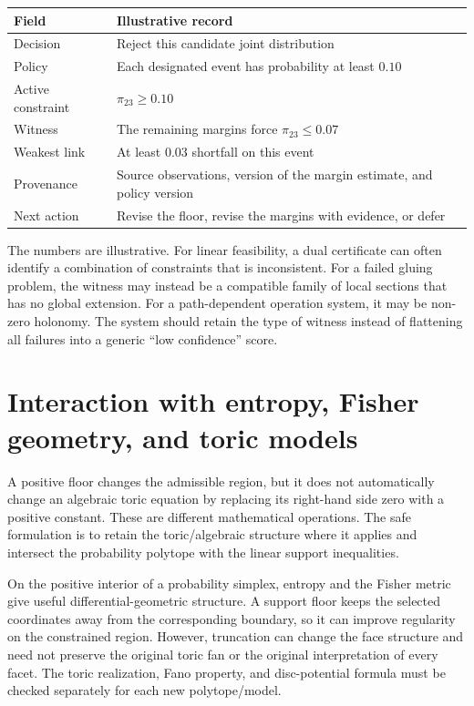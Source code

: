\documentclass[11pt]{article}
\begin{document}
\begin{center}
\begin{tabular}{>{\raggedright\arraybackslash}p{.25\linewidth}p{.64\linewidth}}
\toprule
Field & Illustrative record \\
\midrule
Decision & Reject this candidate joint distribution \\
Policy & Each designated event has probability at least $0.10$ \\
Active constraint & $\pi_{23}\geq0.10$ \\
Witness & The remaining margins force $\pi_{23}\leq0.07$ \\
Weakest link & At least $0.03$ shortfall on this event \\
Provenance & Source observations, version of the margin estimate, and policy version \\
Next action & Revise the floor, revise the margins with evidence, or defer \\
\bottomrule
\end{tabular}
\end{center}

The numbers are illustrative. For linear feasibility, a dual certificate can often identify a combination of constraints that is inconsistent. For a failed gluing problem, the witness may instead be a compatible family of local sections that has no global extension. For a path-dependent operation system, it may be non-zero holonomy. The system should retain the type of witness instead of flattening all failures into a generic ``low confidence'' score.

\section{Interaction with entropy, Fisher geometry, and toric models}

A positive floor changes the admissible region, but it does not automatically change an algebraic toric equation by replacing its right-hand side zero with a positive constant. These are different mathematical operations. The safe formulation is to retain the toric/algebraic structure where it applies and intersect the probability polytope with the linear support inequalities.

On the positive interior of a probability simplex, entropy and the Fisher metric give useful differential-geometric structure. A support floor keeps the selected coordinates away from the corresponding boundary, so it can improve regularity on the constrained region. However, truncation can change the face structure and need not preserve the original toric fan or the original interpretation of every facet. The toric realization, Fano property, and disc-potential formula must be checked separately for each new polytope/model.
\end{document}
